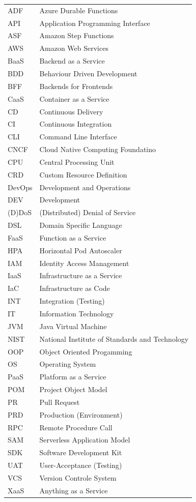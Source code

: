 \documentclass[a4paper,twoside,11pt, pagesize]{scrartcl}
\begin{document}
\begin{tabular}{ p{2cm} p{10cm}} ADF & Azure Durable Functions \\API & Application Programming Interface \\ASF & Amazon Step Functions \\AWS & Amazon Web Services \\BaaS & Backend as a Service \\BDD & Behaviour Driven Development \\BFF & Backends for Frontends \\CaaS & Container as a Service \\  CD & Continuous Delivery \\  CI & Continuous Integration \\CLI & Command Line Interface \\CNCF & Cloud Native Computing Foundatino \\CPU & Central Processing Unit \\CRD & Custom Resource Definition \\DevOps & Development and Operations \\  DEV & Development \\ (D)DoS & (Distributed) Denial of Service \\DSL & Domain Specific Language \\FaaS & Function as a Service \\ HPA & Horizontal Pod Autoscaler \\IAM & Identity Access Management \\IaaS & Infrastructure as a Service \\IaC & Infrastructure as Code \\INT & Integration (Testing) \\IT & Information Technology \\JVM & Java Virtual Machine \\NIST & National Institute of Standards and Technology \\OOP & Object Oriented Progamming \\OS & Operating System \\PaaS & Platform as a Service \\POM & Project Object Model \\PR & Pull Request \\PRD & Production (Environment) \\RPC & Remote Procedure Call \\SAM & Serverless Application Model \\SDK & Software Development Kit \\UAT & User-Acceptance (Testing) \\VCS & Version Controle System \\XaaS & Anything as a Service \\
\end{tabular}
\newpage
\tableofcontents
\newpage
\end{document}
